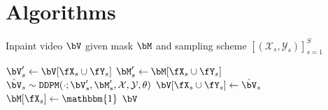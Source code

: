 \chapter{Algorithms}



\begin{algorithm}[h]
\caption{Inpaint video $\bV$ given mask $\bM$ and sampling scheme $\left[(\mathcal{X}_s, \mathcal{Y}_s)\right]^S_{s=1}$}
\label{alg:alg}
\begin{algorithmic}[1]
\State $\bV_s' \gets \bV [\fX_s \cup \fY_s]$
\State $\bM_s' \gets \bM [\fX_s \cup \fY_s]$
\State $\hat{\bV}_s \sim \texttt{DDPM}(\cdot;\bV_s', \bM_s', \mathcal{X}, \mathcal{Y},\theta)$
\State $\bV [\fX_s \cup \fY_s] \gets \hat{\bV}_s$
\State $\bM [\fX_s] \gets \mathbbm{1}$
\EndFor
\State \Return $\bV$
\end{algorithmic}
\end{algorithm}